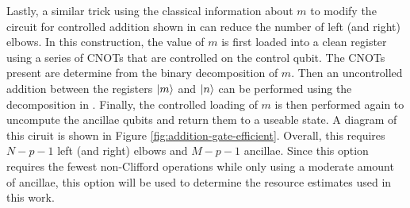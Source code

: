 Lastly, a similar trick using the classical information about $m$ to modify the circuit for controlled addition shown in \cite{gidney2018halving} can reduce the number of left (and right) elbows.
In this construction, the value of $m$ is first loaded into a clean register using a series of CNOTs that are controlled on the control qubit.
The CNOTs present are determine from the binary decomposition of $m$.
Then an uncontrolled addition between the registers $\ket{m}$ and $\ket{n}$ can be performed using the decomposition in \cite{gidney2018halving}.
Finally, the controlled loading of $m$ is then performed again to uncompute the ancillae qubits and return them to a useable state.
A diagram of this ciruit is shown in Figure \ref{fig:addition-gate-efficient}.
Overall, this requires $N - p - 1$ left (and right) elbows and $M - p - 1$ ancillae.
Since this option requires the fewest non-Clifford operations while only using a moderate amount of ancillae, this option will be used to determine the resource estimates used in this work.